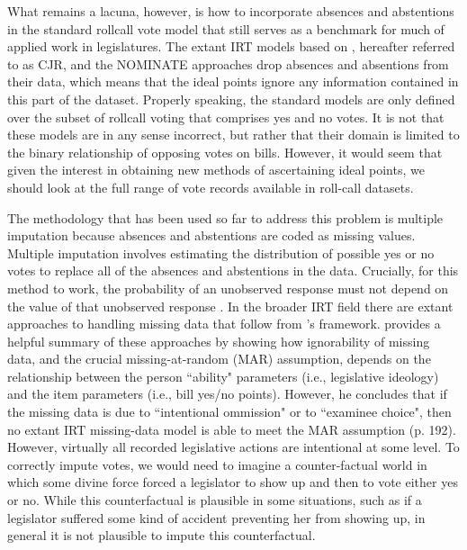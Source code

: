 	What remains a lacuna, however, is how to incorporate absences and abstentions in the standard rollcall vote model that still serves as a benchmark for much of applied work in legislatures. The extant IRT models based on \textcite{jackman2004}, hereafter referred to as CJR, and the NOMINATE approaches \parencite{poole2008} drop absences and absentions from their data, which means that the ideal points ignore any information contained in this part of the dataset. Properly speaking, the standard models are only defined over the subset of rollcall voting that comprises yes and no votes. It is not that these models are in any sense incorrect, but rather that their domain is limited to the binary relationship of opposing votes on bills. However, it would seem that given the interest in obtaining new methods of ascertaining ideal points, we should look at the full range of vote records available in roll-call datasets.
	
	
The methodology that has been used so far to address this problem is multiple imputation because absences and abstentions are coded as missing values. Multiple imputation involves estimating the distribution of possible yes or no votes to replace all of the absences and abstentions in the data. Crucially, for this method to work, the probability of an unobserved response must not depend on the value of that unobserved response \parencite{rubin2002}. 	In the broader IRT field there are extant approaches to handling missing data that follow from \textcite{rubin2002}'s framework. \textcite{mislevy2016} provides a helpful summary of these approaches by showing how ignorability of missing data, and the crucial missing-at-random (MAR) assumption, depends on the relationship between the person ``ability" parameters (i.e., legislative ideology) and the item parameters (i.e., bill yes/no points). However, he concludes that if the missing data is due to ``intentional ommission" or to ``examinee choice", then no extant IRT missing-data model is able to meet the MAR assumption (p. 192). However, virtually all recorded legislative actions are intentional at some level. To correctly impute votes, we would need to imagine a counter-factual world in which some divine force forced a legislator to show up and then to vote either yes or no. While this counterfactual is plausible in some situations, such as if a legislator suffered some kind of accident preventing her from showing up, in general it is not plausible to impute this counterfactual.
	
